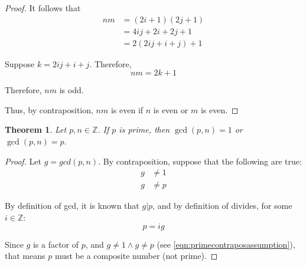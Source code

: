 \documentclass{article}
\newtheorem{theorem}{Theorem}
\numberwithin{subcase}{case}
\begin{document}
\begin{outline}[enumerate]
\begin{proof}
            It follows that 
            \begin{equation}
                \begin{aligned}
                    nm &= (2i + 1)(2j+1) \\
                    &= 4ij + 2i + 2j + 1 \\
                    &= 2(2ij + i + j) + 1
                \end{aligned}
            \end{equation}

            Suppose $k = 2ij + i + j$. Therefore,
            \begin{equation}
                nm = 2k + 1
            \end{equation}

            Therefore, $nm$ is odd.

            Thus, by contraposition, $nm$ is even if $n$ is even or $m$ is even.
        \end{proof}
    \1 \begin{theorem}
            Let $p, n \in \mathbb{Z}$. If $p$ is prime, then $\gcd(p, n) = 1$ or $\gcd(p, n) = p$.
        \end{theorem}

        \2 \begin{proof}
                Let $g = gcd(p, n)$. By contraposition, suppose that the following are true:
                \begin{equation}
                    \begin{aligned}
                        g &\neq 1 \\
                        g &\neq p                        
                    \end{aligned}
                    \label{eqn:primecontraposassumption}
                \end{equation}

                By definition of gcd, it is known that $g | p$, and by definition of divides, for some $i \in \mathbb{Z}$:
                \begin{equation}
                    p = ig
                    \label{eqn:pig1}
                \end{equation}

                Since $g$ is a factor of $p$, and $g \neq 1 \wedge g \neq p$ (see \ref{eqn:primecontraposassumption}), that means $p$ must be 
                a composite number (not prime).
                

\end{proof}
\end{outline}
\end{document}
